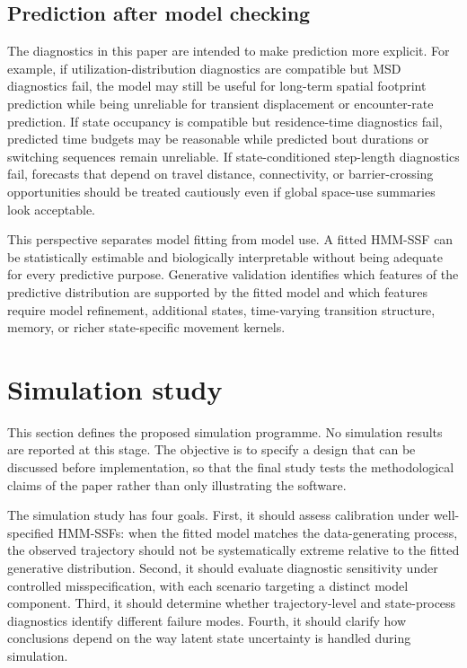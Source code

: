 \documentclass[11pt]{article}
\begin{document}
\subsection{Prediction after model checking}

The diagnostics in this paper are intended to make prediction more explicit.
For example, if utilization-distribution diagnostics are compatible but MSD
diagnostics fail, the model may still be useful for long-term spatial footprint
prediction while being unreliable for transient displacement or encounter-rate
prediction. If state occupancy is compatible but residence-time diagnostics
fail, predicted time budgets may be reasonable while predicted bout durations
or switching sequences remain unreliable. If state-conditioned step-length
diagnostics fail, forecasts that depend on travel distance, connectivity, or
barrier-crossing opportunities should be treated cautiously even if global
space-use summaries look acceptable.

This perspective separates model fitting from model use. A fitted HMM-SSF can
be statistically estimable and biologically interpretable without being
adequate for every predictive purpose. Generative validation identifies which
features of the predictive distribution are supported by the fitted model and
which features require model refinement, additional states, time-varying
transition structure, memory, or richer state-specific movement kernels.

\section{Simulation study}

This section defines the proposed simulation programme. No simulation results
are reported at this stage. The objective is to specify a design that can be
discussed before implementation, so that the final study tests the
methodological claims of the paper rather than only illustrating the software.

The simulation study has four goals. First, it should assess calibration under
well-specified HMM-SSFs: when the fitted model matches the data-generating
process, the observed trajectory should not be systematically extreme relative
to the fitted generative distribution. Second, it should evaluate diagnostic
sensitivity under controlled misspecification, with each scenario targeting a
distinct model component. Third, it should determine whether trajectory-level
and state-process diagnostics identify different failure modes. Fourth, it
should clarify how conclusions depend on the way latent state uncertainty is
handled during simulation.
\end{document}
